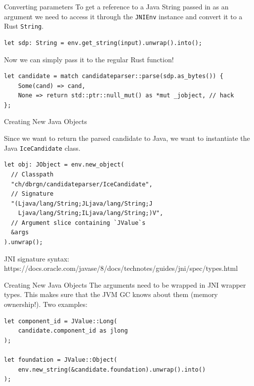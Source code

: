 \documentclass[aspectratio=1610,14pt,t]{beamer}
\begin{document}
\begin{frame}[c,fragile]{Converting parameters}
  To get a reference to a Java String passed in as an argument we need to access
  it through the \texttt{JNIEnv} instance and convert it to a Rust
  \texttt{String}.

  \begin{verbatim}
let sdp: String = env.get_string(input).unwrap().into();
  \end{verbatim}

  Now we can simply pass it to the regular Rust function!

  \begin{verbatim}
let candidate = match candidateparser::parse(sdp.as_bytes()) {
    Some(cand) => cand,
    None => return std::ptr::null_mut() as *mut _jobject, // hack
};
  \end{verbatim}
\end{frame}

\begin{frame}[c,fragile]{Creating New Java Objects}

  Since we want to return the parsed candidate to Java, we want to instantiate
  the Java \texttt{IceCandidate} class.

  \begin{verbatim}
let obj: JObject = env.new_object(
  // Classpath
  "ch/dbrgn/candidateparser/IceCandidate",
  // Signature
  "(Ljava/lang/String;JLjava/lang/String;J
    Ljava/lang/String;ILjava/lang/String;)V",
  // Argument slice containing `JValue`s
  &args
).unwrap();
  \end{verbatim}

  JNI signature syntax:\\
  {\footnotesize https://docs.oracle.com/javase/8/docs/technotes/guides/jni/spec/types.html}

\end{frame}

\begin{frame}[c,fragile]{Creating New Java Objects}
  The arguments need to be wrapped in JNI wrapper types. This makes sure that
  the JVM GC knows about them (memory ownership!). Two examples:

  \begin{verbatim}
let component_id = JValue::Long(
    candidate.component_id as jlong
);

let foundation = JValue::Object(
    env.new_string(&candidate.foundation).unwrap().into()
);
  \end{verbatim}
\end{frame}
\end{document}
